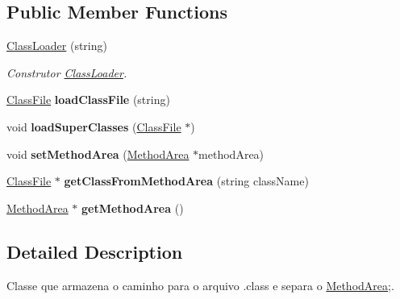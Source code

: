 \subsection*{Public Member Functions}
\begin{DoxyCompactItemize}
\item 
\hyperlink{classClassLoader_a33dea7f5288f739017d61d462b935506}{Class\+Loader} (string)
\begin{DoxyCompactList}\small\item\em Construtor \hyperlink{classClassLoader}{Class\+Loader}. \end{DoxyCompactList}\item 
\hyperlink{classClassFile}{Class\+File} {\bfseries load\+Class\+File} (string)\hypertarget{classClassLoader_a368e94d895b9e99c66e9b39dd7025e67}{}\label{classClassLoader_a368e94d895b9e99c66e9b39dd7025e67}

\item 
void {\bfseries load\+Super\+Classes} (\hyperlink{classClassFile}{Class\+File} $\ast$)\hypertarget{classClassLoader_ad704891933608240ea282e835e92aaa2}{}\label{classClassLoader_ad704891933608240ea282e835e92aaa2}

\item 
void {\bfseries set\+Method\+Area} (\hyperlink{classMethodArea}{Method\+Area} $\ast$method\+Area)\hypertarget{classClassLoader_a3f432b26ce13cd17da2986320b6060c8}{}\label{classClassLoader_a3f432b26ce13cd17da2986320b6060c8}

\item 
\hyperlink{classClassFile}{Class\+File} $\ast$ {\bfseries get\+Class\+From\+Method\+Area} (string class\+Name)\hypertarget{classClassLoader_ac792ecbaa98738fddee0c4285759ce2c}{}\label{classClassLoader_ac792ecbaa98738fddee0c4285759ce2c}

\item 
\hyperlink{classMethodArea}{Method\+Area} $\ast$ {\bfseries get\+Method\+Area} ()\hypertarget{classClassLoader_a2a28f4514a3223fa4534d5dccd12612c}{}\label{classClassLoader_a2a28f4514a3223fa4534d5dccd12612c}

\end{DoxyCompactItemize}


\subsection{Detailed Description}
Classe que armazena o caminho para o arquivo .class e separa o \hyperlink{classMethodArea}{Method\+Area};. 

